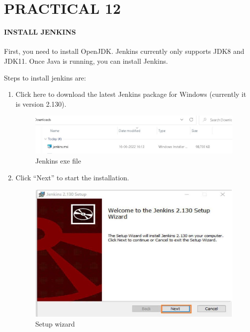\documentclass[12pt]{article}
\begin{document}
\clearpage

\section{PRACTICAL 12}

\textbf{\uppercase {Install Jenkins}} \\
\vspace{0.1\baselineskip} \\

First, you need to install OpenJDK. Jenkins currently only supports JDK8 and JDK11. Once Java is running, you can install Jenkins.

Steps to install jenkins are: 
\begin{enumerate}
\item Click here to download the latest Jenkins package for Windows (currently it is version 2.130).

\begin{figure}[H]
\centering
\includegraphics[scale=0.8]{fig51a}
\caption{Jenkins exe file}
\vspace{0.6\baselineskip}
\end{figure}


\item Click “Next” to start the installation.


\begin{figure}[H]
\centering
\includegraphics[scale=0.8]{fig52}
\caption{Setup wizard}
\vspace{0.6\baselineskip}
\end{figure}


\end{enumerate}
\end{document}
